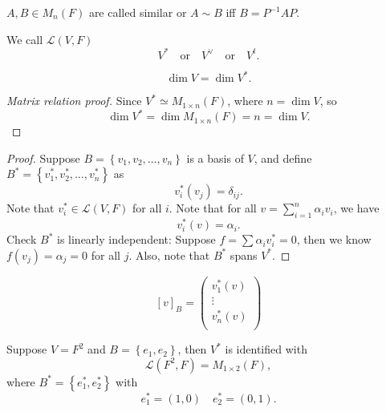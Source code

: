 \begin{definition}
    \(A, B \in M_n(F)\) are called similar or \(A \sim B\) iff \(B = P^{-1} A P \).    
\end{definition}

\begin{notation}
    We call \(\mathcal{L} (V, F)\)
    \[
        V^* \quad \text{or} \quad V^{\vee} \quad \text{or} \quad V^t.
    \] 
\end{notation}

\begin{theorem}
    \[
        \dim V = \dim V^*.
    \]
\end{theorem}
\begin{proof}[Matrix relation proof]
    Since \(V^* \simeq M_{1 \times n}(F)\), where \(n = \dim V\), so 
    \[
        \dim V^* = \dim M_{1 \times n}(F) = n = \dim V. 
    \]  
\end{proof}
\begin{proof}
    Suppose \(B = \left\{ v_1, v_2, \dots , v_n \right\} \) is a basis of \(V\), and define \(B^* = \left\{ v_1^*, v_2^*, \dots , v_n^* \right\} \) as 
    \[
        v_i^* \left( v_j \right) = \delta _{ij}. 
    \] Note that \(v_i^* \in \mathcal{L} (V, F)\) for all \(i\). Note that for all \(v = \sum_{i=1}^{n} \alpha _i v_i\), we have 
    \[
        v_i^* \left( v \right) = \alpha _i. 
    \] Check \(B^*\) is linearly independent: Suppose \(f = \sum \alpha _i v_i^* = 0 \), then we know \(f(v_j) = \alpha _j = 0\) for all \(j\). Also, note that \(B^*\) spans \(V^*\).       
\end{proof}

\begin{remark} \label{rmk: coordinate by dual basis}
    \[
        [v]_B = \begin{pmatrix}
             v_1^*(v) \\
              \vdots \\
              v_n^*(v) \\
        \end{pmatrix}
    \]
\end{remark}

\begin{eg}
    Suppose \(V = F^2\) and \(B = \left\{ e_1, e_2 \right\} \), then \(V^*\) is identified with 
    \[
        \mathcal{L} \left( F^2, F \right) = M_{1 \times 2}(F), 
    \] where \(B^* = \left\{ e_1^*, e_2^* \right\} \) with 
    \[
        e_1^* = (1, 0) \quad e_2^* = (0, 1).
    \] 
\end{eg}

